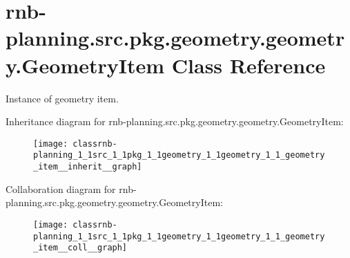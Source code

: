 \hypertarget{classrnb-planning_1_1src_1_1pkg_1_1geometry_1_1geometry_1_1_geometry_item}{}\section{rnb-\/planning.src.\+pkg.\+geometry.\+geometry.\+Geometry\+Item Class Reference}
\label{classrnb-planning_1_1src_1_1pkg_1_1geometry_1_1geometry_1_1_geometry_item}


Instance of geometry item.  




Inheritance diagram for rnb-\/planning.src.\+pkg.\+geometry.\+geometry.\+Geometry\+Item\+:
\nopagebreak
\begin{figure}[H]
\begin{center}
\leavevmode
\texttt{[image: classrnb-planning\_1\_1src\_1\_1pkg\_1\_1geometry\_1\_1geometry\_1\_1\_geometry\_item\_\_inherit\_\_graph]}
\end{center}
\end{figure}


Collaboration diagram for rnb-\/planning.src.\+pkg.\+geometry.\+geometry.\+Geometry\+Item\+:
\nopagebreak
\begin{figure}[H]
\begin{center}
\leavevmode
\texttt{[image: classrnb-planning\_1\_1src\_1\_1pkg\_1\_1geometry\_1\_1geometry\_1\_1\_geometry\_item\_\_coll\_\_graph]}
\end{center}
\end{figure}
